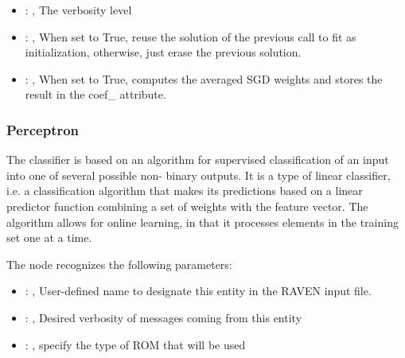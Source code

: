 \begin{itemize}
    \item {}: ,
      The verbosity level

    \item {}: ,
      When set to True, reuse the solution of the previous call
      to fit as initialization, otherwise, just erase the previous solution.

    \item {}: ,
      When set to True, computes the averaged SGD weights and
      stores the result in the coef\_ attribute.
  \end{itemize}


\subsubsection{Perceptron}
  The  classifier is based on an                         algorithm for
  supervised classification of                         an input into one of several possible non-
  binary outputs.                         It is a type of linear classifier, i.e. a classification
  algorithm that makes                         its predictions based on a linear predictor function
  combining a set of weights                         with the feature vector.
  The algorithm allows for online learning, in that it processes elements in the
  training set one at a time.                         

  The  node recognizes the following parameters:
    \begin{itemize}
      \item {}: ,
        User-defined name to designate this entity in the RAVEN input file.
      \item {}: ,
        Desired verbosity of messages coming from this entity
      \item {}: ,
        specify the type of ROM that will be used
  \end{itemize}

